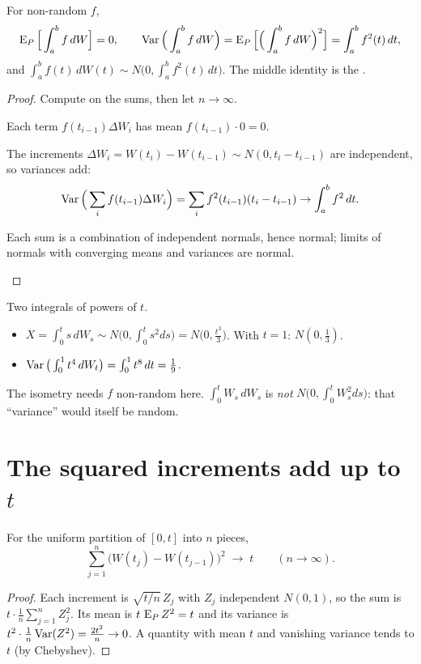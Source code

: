 \begin{theorem}
\label{thm:isometry}
For non-random $f$,
\[
  \operatorname{E}_P\Big[\int_a^bf\,dW\Big]=0,\qquad
  \operatorname{Var}\Big(\int_a^bf\,dW\Big)=\operatorname{E}_P\Big[\Big(\int_a^bf\,dW\Big)^2\Big]=\int_a^bf^2(t)\,dt,
\]
and $\displaystyle\int_a^bf(t)\,dW(t)\sim N\Big(0,\int_a^bf^2(t)\,dt\Big)$. The middle identity is the .
\end{theorem}
\begin{proof}
Compute on the sums, then let $n\to\infty$.
\begin{steps}
  \item Each term $f(t_{i-1})\Delta W_i$ has mean $f(t_{i-1})\cdot0=0$.
  \item The increments $\Delta W_i=W(t_i)-W(t_{i-1})\sim N(0,t_i-t_{i-1})$ are independent, so variances add:
  \[
    \operatorname{Var}\Big(\sum_if(t_{i-1})\Delta W_i\Big)=\sum_if^2(t_{i-1})(t_i-t_{i-1})\to\int_a^bf^2\,dt .
  \]
  \item Each sum is a combination of independent normals, hence normal; limits of normals with converging means and variances are normal. \qedhere
\end{steps}
\end{proof}

\begin{example}
\label{ex:ito-dist}
Two integrals of powers of $t$.
\begin{itemize}
  \item $X=\int_0^ts\,dW_s\sim N\big(0,\int_0^ts^2ds\big)=N\big(0,\frac{t^3}{3}\big)$. With $t=1$: $N(0,\frac13)$.
  \item $\operatorname{Var}\big(\int_0^1t^4\,dW_t\big)=\int_0^1t^8\,dt=\frac19$.
\end{itemize}
\end{example}

The isometry needs $f$ non-random here. $\int_0^tW_s\,dW_s$ is \emph{not} $N\big(0,\int_0^tW_s^2ds\big)$: that ``variance'' would itself be random.

\section{The squared increments add up to \texorpdfstring{$t$}{t}}

\begin{theorem}
\label{thm:qv}
For the uniform partition of $[0,t]$ into $n$ pieces,
\[
  \sum_{j=1}^n\big(W(t_j)-W(t_{j-1})\big)^2\;\longrightarrow\;t\qquad(n\to\infty).
\]
\end{theorem}
\begin{proof}
Each increment is $\sqrt{t/n}\,Z_j$ with $Z_j$ independent $N(0,1)$, so the sum is $t\cdot\frac1n\sum_{j=1}^nZ_j^2$. Its mean is $t\,\operatorname{E}_PZ^2=t$ and its variance is $t^2\cdot\frac1n\operatorname{Var}(Z^2)=\frac{2t^2}{n}\to0$. A quantity with mean $t$ and vanishing variance tends to $t$ (by Chebyshev).
\end{proof}

